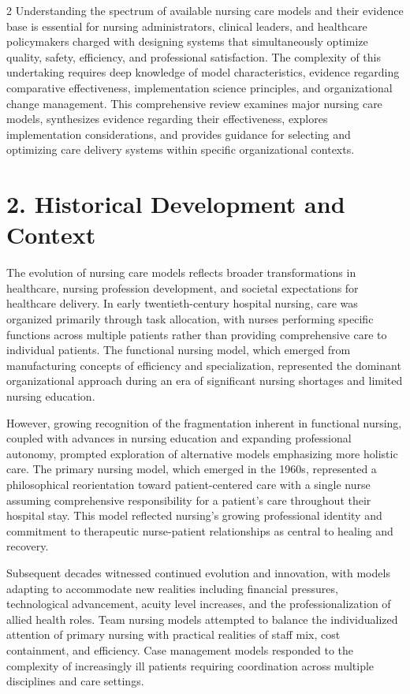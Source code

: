 \documentclass[12pt]{article}
\begin{document}
\begin{multicols}{2}
Understanding the spectrum of available nursing care models and their evidence base is essential for nursing administrators, clinical leaders, and healthcare policymakers charged with designing systems that simultaneously optimize quality, safety, efficiency, and professional satisfaction. The complexity of this undertaking requires deep knowledge of model characteristics, evidence regarding comparative effectiveness, implementation science principles, and organizational change management. This comprehensive review examines major nursing care models, synthesizes evidence regarding their effectiveness, explores implementation considerations, and provides guidance for selecting and optimizing care delivery systems within specific organizational contexts.

\section*{2. \quad Historical Development and Context}

The evolution of nursing care models reflects broader transformations in healthcare, nursing profession development, and societal expectations for healthcare delivery. In early twentieth-century hospital nursing, care was organized primarily through task allocation, with nurses performing specific functions across multiple patients rather than providing comprehensive care to individual patients. The functional nursing model, which emerged from manufacturing concepts of efficiency and specialization, represented the dominant organizational approach during an era of significant nursing shortages and limited nursing education.

However, growing recognition of the fragmentation inherent in functional nursing, coupled with advances in nursing education and expanding professional autonomy, prompted exploration of alternative models emphasizing more holistic care. The primary nursing model, which emerged in the 1960s, represented a philosophical reorientation toward patient-centered care with a single nurse assuming comprehensive responsibility for a patient's care throughout their hospital stay. This model reflected nursing's growing professional identity and commitment to therapeutic nurse-patient relationships as central to healing and recovery.

Subsequent decades witnessed continued evolution and innovation, with models adapting to accommodate new realities including financial pressures, technological advancement, acuity level increases, and the professionalization of allied health roles. Team nursing models attempted to balance the individualized attention of primary nursing with practical realities of staff mix, cost containment, and efficiency. Case management models responded to the complexity of increasingly ill patients requiring coordination across multiple disciplines and care settings.


\end{multicols}
\end{document}
